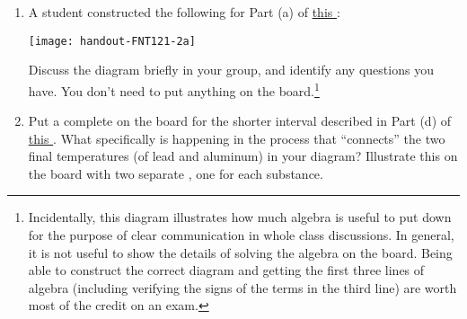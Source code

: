 \begin{enumerate}[1.]
	\item A student constructed the following \EnergyDiagram{} for Part (a) of \hyperref[\FNT1.2.1-2]{this \FNT}:

	\texttt{[image: handout-FNT121-2a]}
	
	Discuss the diagram briefly in your group, and identify any questions you have. You don't need to put anything on the board.\footnote{Incidentally, this diagram illustrates how much algebra is useful to put down for the purpose of clear communication in whole class discussions. In general, it is not useful to show the details of solving the algebra on the board. Being able to construct the correct diagram and getting the first three lines of algebra (including verifying the signs of the terms in the third line) are worth most of the credit on an exam.}
	
	
	\item Put a complete \EnergyDiagram{} on the board for the shorter interval described in Part (d) of \hyperref[\FNT1.2.1-2]{this \FNT}. What specifically is happening in the process that ``connects'' the two final temperatures (of lead and aluminum) in your diagram? Illustrate this on the board with two separate \TempGraphs{}, one for each substance.
	
	

\WCD 

\end{enumerate}

